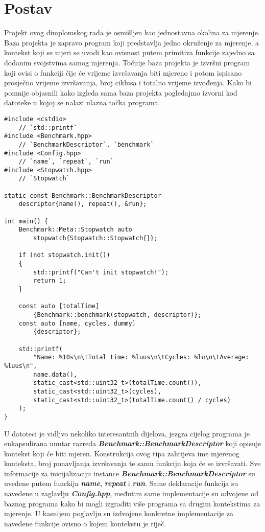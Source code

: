 \section{Postav}\label{section:setup}
Projekt ovog dimplomskog rada je osmišljen kao jednostavna okolina za mjerenje. Baza projekta je zapravo program koji predstavlja jedno okruženje za mjerenje, a kontekst koji se mjeri se uvodi kao ovisnost putem primitiva funkcije zajedno sa dodanim svojstvima samog mjerenja. Točnije baza projekta je izvršni program koji ovisi o funkciji čije će vrijeme izvršavanja biti mjereno i potom ispisano prosječno vrijeme izvršavanja, broj ciklusa i totalno vrijeme izvođenja. Kako bi pomnije objasnili kako izgleda sama baza projekta pogledajmo izvorni kod datoteke u kojoj se nalazi ulazna točka programa.
\lstset{language=C++, tabsize=2, frame=single, breaklines=true, showstringspaces=false}
\begin{lstlisting}
#include <cstdio>
    // `std::printf`
#include <Benchmark.hpp>
    // `BenchmarkDescriptor`, `benchmark`
#include <Config.hpp> 
    // `name`, `repeat`, `run`
#include <Stopwatch.hpp>
    // `Stopwatch`

static const Benchmark::BenchmarkDescriptor 
    descriptor{name(), repeat(), &run};

int main() {
    Benchmark::Meta::Stopwatch auto 
        stopwatch{Stopwatch::Stopwatch{}};

    if (not stopwatch.init()) 
    {
        std::printf("Can't init stopwatch!");
        return 1;
    }

    const auto [totalTime]
        {Benchmark::benchmark(stopwatch, descriptor)};
    const auto [name, cycles, dummy]
        {descriptor};

    std::printf(
        "Name: %10s\n\tTotal time: %luus\n\tCycles: %lu\n\tAverage: %luus\n",
        name.data(), 
        static_cast<std::uint32_t>(totalTime.count()),
        static_cast<std::uint32_t>(cycles),
        static_cast<std::uint32_t>(totalTime.count() / cycles)
    );
}
\end{lstlisting}
U datoteci je vidljvo nekoliko interesantnih dijelova, jezgra cijelog programa je enkapsulirana unutar razreda \textbf{\textit{Benchmark::BenchmarkDescriptor}} koji opisuje kontekst koji će biti mjeren. Konstrukcija ovog tipa zahtijeva ime mjerenog konteksta, broj ponavljanja izvršavanja te samu funkciju koja će se izvršavati. Sve informacije za inicijalizaciju instance \textbf{\textit{Benchmark::BenchmarkDescriptor}} su uvedene putem funckija \textbf{\textit{name}}, \textbf{\textit{repeat}} i \textbf{\textit{run}}. Same deklaracije funkcija su navedene u zaglavlju \textbf{\textit{Config.hpp}}, međutim same implementacije su odvojene od baznog programa kako bi mogli izgraditi više programa sa drugim kontekstima za mjerenje. U kasnijem poglavlju su izdvojene konkretne implementacije za navedene funkcije ovisno o kojem kontekstu je riječ.\\
